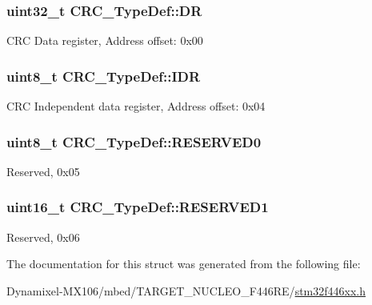 \subsubsection[{\texorpdfstring{DR}{DR}}]{ uint32\+\_\+t C\+R\+C\+\_\+\+Type\+Def\+::\+DR}\hypertarget{struct_c_r_c___type_def_a50cb22870dbb9001241cec694994e5ef}{}\label{struct_c_r_c___type_def_a50cb22870dbb9001241cec694994e5ef}
C\+RC Data register, Address offset\+: 0x00 
\subsubsection[{\texorpdfstring{I\+DR}{IDR}}]{ uint8\+\_\+t C\+R\+C\+\_\+\+Type\+Def\+::\+I\+DR}\hypertarget{struct_c_r_c___type_def_ad84e8694cd4b5375ee533c2d875c3b5a}{}\label{struct_c_r_c___type_def_ad84e8694cd4b5375ee533c2d875c3b5a}
C\+RC Independent data register, Address offset\+: 0x04 
\subsubsection[{\texorpdfstring{R\+E\+S\+E\+R\+V\+E\+D0}{RESERVED0}}]{\setlength{\rightskip}{0pt plus 5cm}uint8\+\_\+t C\+R\+C\+\_\+\+Type\+Def\+::\+R\+E\+S\+E\+R\+V\+E\+D0}\hypertarget{struct_c_r_c___type_def_a70dfd1730dba65041550ef55a44db87c}{}\label{struct_c_r_c___type_def_a70dfd1730dba65041550ef55a44db87c}
Reserved, 0x05 
\subsubsection[{\texorpdfstring{R\+E\+S\+E\+R\+V\+E\+D1}{RESERVED1}}]{\setlength{\rightskip}{0pt plus 5cm}uint16\+\_\+t C\+R\+C\+\_\+\+Type\+Def\+::\+R\+E\+S\+E\+R\+V\+E\+D1}\hypertarget{struct_c_r_c___type_def_a8b205c6e25b1808ac016db2356b3021d}{}\label{struct_c_r_c___type_def_a8b205c6e25b1808ac016db2356b3021d}
Reserved, 0x06 

The documentation for this struct was generated from the following file\+:\begin{DoxyCompactItemize}
\item 
Dynamixel-\/\+M\+X106/mbed/\+T\+A\+R\+G\+E\+T\+\_\+\+N\+U\+C\+L\+E\+O\+\_\+\+F446\+R\+E/\hyperlink{stm32f446xx_8h}{stm32f446xx.\+h}\end{DoxyCompactItemize}
